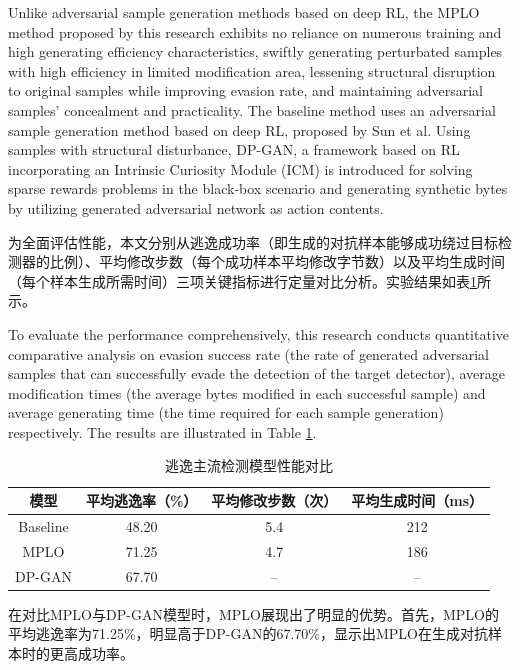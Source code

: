 Unlike adversarial sample generation methods based on deep RL, the MPLO method proposed by this research exhibits no reliance on numerous training and high generating efficiency characteristics, swiftly generating perturbated samples with high efficiency in limited modification area, lessening structural disruption to original samples while improving evasion rate, and maintaining adversarial samples' concealment and practicality. The baseline method uses an adversarial sample generation method based on deep RL, proposed by Sun et al\cite{孙贺2024基于深度强化学习的恶意}. Using samples with structural disturbance, DP-GAN\cite{zhan2024enhancing}, a framework based on RL incorporating an Intrinsic Curiosity Module (ICM) is introduced for solving sparse rewards problems in the black-box scenario and generating synthetic bytes by utilizing generated adversarial network as action contents.

为全面评估性能，本文分别从逃逸成功率（即生成的对抗样本能够成功绕过目标检测器的比例）、平均修改步数（每个成功样本平均修改字节数）以及平均生成时间（每个样本生成所需时间）三项关键指标进行定量对比分析。实验结果如表\ref{tab:5.10}所示。

To evaluate the performance comprehensively, this research conducts quantitative comparative analysis on evasion success rate (the rate of generated adversarial samples that can successfully evade the detection of the target detector), average modification times (the average bytes modified in each successful sample) and average generating time (the time required for each sample generation) respectively. The results are illustrated in Table \ref{tab:5.10}.

\begin{table}[htbp]
	\centering
	\caption{逃逸主流检测模型性能对比}
	\label{tab:5.10}
	\begin{tabular*}{0.9\textwidth}{@{\extracolsep{\fill}}cccc}
		\toprule
		模型 & 平均逃逸率（\%） & 平均修改步数（次） & 平均生成时间（ms） \\
		\midrule
		Baseline & 48.20 & 5.4 & 212 \\
		MPLO & 71.25 & 4.7 & 186 \\
		DP-GAN & 67.70 & -- & -- \\
		\bottomrule
	\end{tabular*}
\end{table}

在对比MPLO与DP-GAN模型时，MPLO展现出了明显的优势。首先，MPLO的平均逃逸率为71.25\%，明显高于DP-GAN的67.70\%，显示出MPLO在生成对抗样本时的更高成功率。

